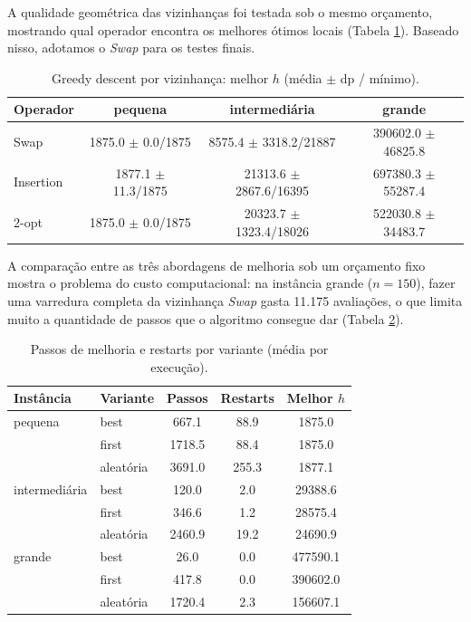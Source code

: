 A qualidade geométrica das vizinhanças foi testada sob o mesmo orçamento, mostrando qual operador encontra os melhores ótimos locais (Tabela \ref{tab:vizinhancas}). Baseado nisso, adotamos o \textit{Swap} para os testes finais.

\begin{table}[H]
\centering
\caption{Greedy descent por vizinhança: melhor $h$ (média $\pm$ dp / mínimo).}
\label{tab:vizinhancas}
\begin{tabular}{lccc}
\toprule
Operador  & pequena & intermediária & grande \\
\midrule
Swap & 1875.0 $\pm$ 0.0/1875 & 8575.4 $\pm$ 3318.2/21887 & 390602.0 $\pm$ 46825.8 \\
Insertion & 1877.1 $\pm$ 11.3/1875 & 21313.6 $\pm$ 2867.6/16395 & 697380.3 $\pm$ 55287.4 \\
2-opt & 1875.0 $\pm$ 0.0/1875 & 20323.7 $\pm$ 1323.4/18026 & 522030.8 $\pm$ 34483.7 \\
\bottomrule
\end{tabular}
\end{table}

A comparação entre as três abordagens de melhoria sob um orçamento fixo mostra o problema do custo computacional: na instância grande ($n=150$), fazer uma varredura completa da vizinhança \textit{Swap} gasta 11.175 avaliações, o que limita muito a quantidade de passos que o algoritmo consegue dar (Tabela \ref{tab:gd-passos}). 

\begin{table}[H]
\centering
\caption{Passos de melhoria e restarts por variante (média por execução).}
\label{tab:gd-passos}
\begin{tabular}{llccc}
\toprule
Instância & Variante & Passos & Restarts & Melhor $h$ \\
\midrule
pequena & best & 667.1 & 88.9 & 1875.0 \\
 & first & 1718.5 & 88.4 & 1875.0 \\
 & aleat\'oria & 3691.0 & 255.3 & 1877.1 \\
\midrule
intermedi\'aria & best & 120.0 & 2.0 & 29388.6 \\
 & first & 346.6 & 1.2 & 28575.4 \\
 & aleat\'oria & 2460.9 & 19.2 & 24690.9 \\
\midrule
grande & best & 26.0 & 0.0 & 477590.1 \\
 & first & 417.8 & 0.0 & 390602.0 \\
 & aleat\'oria & 1720.4 & 2.3 & 156607.1 \\
\bottomrule
\end{tabular}
\end{table}